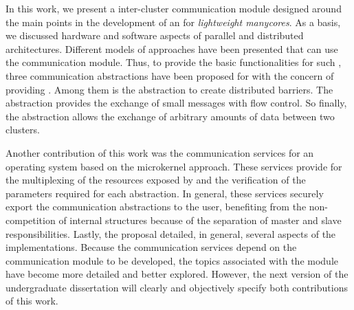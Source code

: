 In this work, we present a inter-cluster communication module
designed around the main points in the development of an \os for \textit{lightweight manycores}.
As a basis, we discussed hardware and software aspects of parallel
and distributed architectures.
Different models of \os approaches have been presented that can
use the communication module.
Thus, to provide the basic functionalities for such \oss, three
communication abstractions have been proposed for \hal with the
concern of providing \qos.
Among them is the \sync abstraction to create distributed barriers.
The \mailbox abstraction provides the exchange of small messages
with flow control.
So finally, the \portal abstraction allows the exchange of
arbitrary amounts of data between two clusters.

Another contribution of this work was the communication services
for an operating system based on the microkernel approach.
These services provide for the multiplexing of the resources
exposed by \hal and the verification of the parameters required
for each abstraction.
In general, these services securely export the communication
abstractions to the user, benefiting from the non-competition
of \os internal structures because of the separation of master
and slave responsibilities.
Lastly, the proposal detailed, in general, several aspects of
the implementations.
Because the communication services depend on the \hal communication
module to be developed, the topics associated with
the module have become more detailed and better explored.
However, the next version of the undergraduate dissertation
will clearly and objectively specify both contributions of this work.
